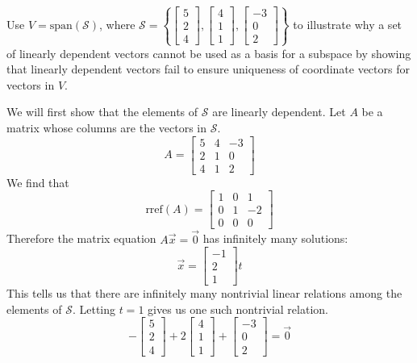 \documentclass{ximera}
\begin{document}
\begin{example}\label{ex:lindepandbasis}
Use $V=\mbox{span}(\mathcal{S})$, where $\mathcal{S}=\left\{\begin{bmatrix}5\\2\\4\end{bmatrix},\begin{bmatrix}4\\1\\1\end{bmatrix},\begin{bmatrix}-3\\0\\2\end{bmatrix}\right\}$ to illustrate why a set of linearly dependent vectors cannot be used as a basis for a subspace by showing that linearly dependent vectors fail to ensure uniqueness of coordinate vectors  for vectors in $V$.
\begin{explanation}
We will first show that the elements of $\mathcal{S}$ are linearly dependent.  Let $A$ be a matrix whose columns are the vectors in $\mathcal{S}$.
$$A=\begin{bmatrix}5&4&-3\\2&1&0\\4&1&2\end{bmatrix}$$
We find that 
$$\mbox{rref}(A) = \begin{bmatrix}  
 1&0&1\\0&1&-2\\0&0&0
 \end{bmatrix}$$
Therefore the matrix equation  $A\vec{x}=\vec{0}$ has infinitely many solutions:
$$\vec{x}=\begin{bmatrix}-1\\2\\1\end{bmatrix}t$$
This tells us that there are infinitely many nontrivial linear relations among the elements of $\mathcal{S}$.  Letting $t=1$ gives us one such nontrivial relation.
$$-\begin{bmatrix}5\\2\\4\end{bmatrix}+2\begin{bmatrix}4\\1\\1\end{bmatrix}+\begin{bmatrix}-3\\0\\2\end{bmatrix}=\vec{0}$$


\end{explanation}
\end{example}
\end{document}
